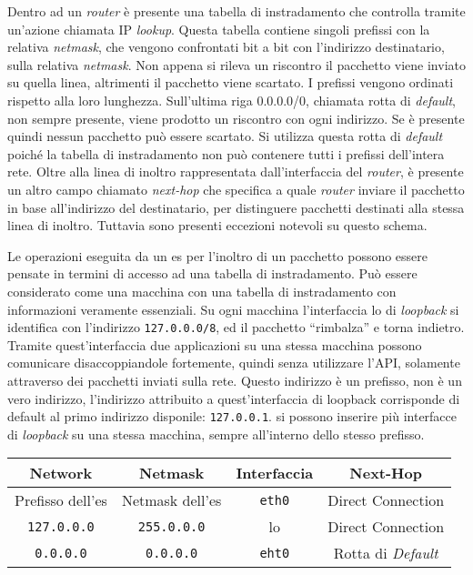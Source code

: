 \documentclass{article}
\numberwithin{equation}{subsection}
\begin{document}
Dentro ad un \textit{router} è presente una tabella di instradamento che controlla tramite un'azione chiamata \textcolor{Bittersweet}{IP} \textit{lookup}. Questa tabella contiene singoli prefissi con la relativa \textit{netmask}, che 
vengono confrontati bit a bit con l'indirizzo destinatario, sulla relativa \textit{netmask}. Non appena si rileva un riscontro il pacchetto viene inviato su quella linea, 
altrimenti il pacchetto viene scartato. I prefissi vengono ordinati rispetto alla loro lunghezza. Sull'ultima riga 0.0.0.0/0, chiamata rotta di \textit{default}, non sempre presente, 
viene prodotto un riscontro con ogni indirizzo. Se è presente quindi nessun pacchetto può essere scartato. 
Si utilizza questa rotta di \textit{default} poiché la tabella di instradamento non può contenere tutti i prefissi dell'intera rete. 
Oltre alla linea di inoltro rappresentata dall'interfaccia del \textit{router}, è presente un altro campo chiamato \textit{next-hop} che specifica a quale \textit{router} inviare il pacchetto 
in base all'indirizzo del destinatario, per distinguere pacchetti destinati alla stessa linea di inoltro. Tuttavia sono presenti eccezioni notevoli su questo schema. 

Le operazioni eseguita da un \textcolor{Periwinkle}{es} per l'inoltro di un pacchetto possono essere pensate in termini di accesso ad una tabella di instradamento. Può 
essere considerato come una macchina con una tabella di instradamento con informazioni veramente essenziali. 
Su ogni macchina l'interfaccia lo di \textit{loopback} si identifica con l'indirizzo \texttt{127.0.0.0/8}, ed il pacchetto ``rimbalza'' e torna indietro. Tramite quest'interfaccia 
due applicazioni su una stessa macchina possono comunicare disaccoppiandole fortemente, quindi senza utilizzare l'API, solamente attraverso dei pacchetti inviati sulla rete.
Questo indirizzo è un prefisso, non è un vero indirizzo, l'indirizzo attribuito a quest'interfaccia di loopback corrisponde di default al primo indirizzo 
disponile: \texttt{127.0.0.1}. si possono inserire più interfacce di \textit{loopback} su una stessa macchina, sempre all'interno dello stesso prefisso. 

\begin{center}
    \begin{tabular}{|c|c|c|c|}
        \hline
        Network&Netmask&Interfaccia&Next-Hop\\
        \hline
        Prefisso dell'\textcolor{Periwinkle}{es}&Netmask dell'\textcolor{Periwinkle}{es}& \texttt{eth0}& Direct Connection\\\hline
        \texttt{127.0.0.0}&\texttt{255.0.0.0}&lo&Direct Connection\\\hline
        \texttt{0.0.0.0}&\texttt{0.0.0.0}&\texttt{eht0}&Rotta di \textit{Default}\\\hline        
    \end{tabular}
\end{center}
\end{document}
